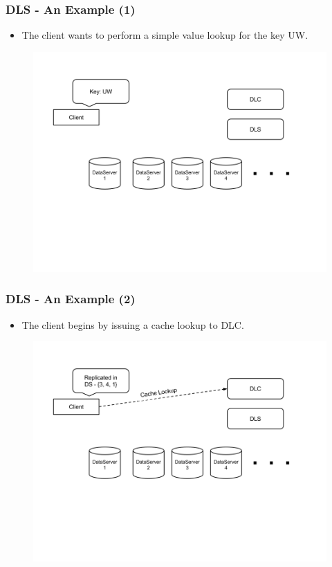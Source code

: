 \documentclass{beamer}
\begin{document}
\begin{frame}
  \frametitle{DLS - An Example (1)}
  \begin{itemize}
  \item The client wants to perform a simple value lookup for the key UW.
  \end{itemize}
  \begin{figure}
    \begin{center}
      \centerline{\includegraphics[scale=0.40]{img/DLS_Example2.png}}
    \end{center}
  \end{figure}
\end{frame}


\begin{frame}
  \frametitle{DLS - An Example (2)}
  \begin{itemize}
  \item The client begins by issuing a cache lookup to DLC.
\newline
  \end{itemize}
  \begin{figure}
    \begin{center}
      \centerline{\includegraphics[scale=0.40]{img/DLS_Example3.png}}
    \end{center}
  \end{figure}


\end{frame}
\end{document}
